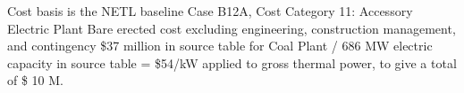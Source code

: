 Cost basis is the NETL baseline Case B12A, Cost Category 11: Accessory Electric Plant Bare erected cost excluding engineering, construction management, and contingency \$37 million in source table for Coal Plant / 686 MW electric capacity in source table = \$54/kW applied to gross  thermal power, to give a total of \$ 10 M.